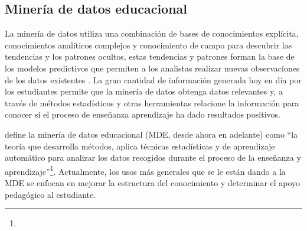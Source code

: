 \subsection{Minería de datos educacional}
La minería de datos utiliza una combinación de bases de conocimientos explícita, conocimientos analíticos complejos y conocimiento de campo para descubrir las tendencias y los patrones ocultos, estas tendencias y patrones forman la base de los modelos predictivos que permiten a los analistas realizar nuevas observaciones de los datos existentes \parencite{luan2002data}. La gran cantidad de información generada hoy en día por los estudiantes permite que la minería de datos obtenga datos relevantes y, a través de métodos estadísticos y otras herramientas relacione la información para conocer si el proceso de enseñanza aprendizaje ha dado resultados positivos. 

\textcite[p.~9]{mining2012enhancing} define la minería de datos educacional (MDE, desde ahora en adelante) como “la teoría que desarrolla métodos, aplica técnicas estadísticas y de aprendizaje automático para analizar los datos recogidos durante el proceso de la enseñanza y aprendizaje”\footnote{\traduccionlibre}. Actualmente, los usos más generales que se le están dando a la MDE se enfocan en mejorar la estructura del conocimiento y determinar el apoyo pedagógico al estudiante.